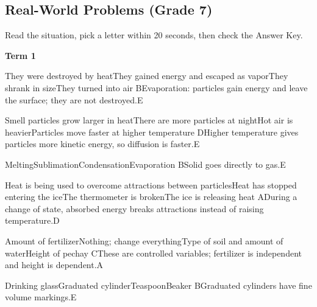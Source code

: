\subsection{Real-World Problems (Grade 7)}
{\small Read the situation, pick a letter within 20 seconds, then check the Answer Key.\par}
\begin{gradebody}

\textbf{Term 1}

{They were destroyed by heat}{They gained energy and escaped as vapor}{They shrank in size}{They turned into air}
{B}{Evaporation: particles gain energy and leave the surface; they are not destroyed.}{E}

{Smell particles grow larger in heat}{There are more particles at night}{Hot air is heavier}{Particles move faster at higher temperature}
{D}{Higher temperature gives particles more kinetic energy, so diffusion is faster.}{E}

{Melting}{Sublimation}{Condensation}{Evaporation}
{B}{Solid goes directly to gas.}{E}

{Heat is being used to overcome attractions between particles}{Heat has stopped entering the ice}{The thermometer is broken}{The ice is releasing heat}
{A}{During a change of state, absorbed energy breaks attractions instead of raising temperature.}{D}

{Amount of fertilizer}{Nothing; change everything}{Type of soil and amount of water}{Height of pechay}
{C}{These are controlled variables; fertilizer is independent and height is dependent.}{A}

{Drinking glass}{Graduated cylinder}{Teaspoon}{Beaker}
{B}{Graduated cylinders have fine volume markings.}{E}


\end{gradebody}
